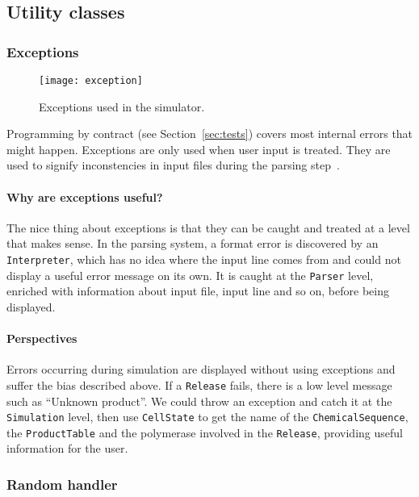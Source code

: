 
\subsection{Utility classes}

\subsubsection{Exceptions}

\begin{figure}[!h]
  \centering
  \texttt{[image: exception]}
  \caption{Exceptions used in the simulator.}
  \label{fig:exception}
\end{figure}

Programming by contract (see Section~\ref{sec:tests}) covers most internal errors that might happen. Exceptions are only used when user input is treated. They are used to signify inconstencies in input files during the parsing step~.

\paragraph{Why are exceptions useful?} The nice thing about exceptions is that they can be caught and treated at a level that makes sense. In the parsing system, a format error is discovered by an \texttt{Interpreter}, which has no idea where the input line comes from and could not display a useful error message on its own. It is caught at the \texttt{Parser} level, enriched with information about input file, input line and so on, before being displayed.

\paragraph{Perspectives} Errors occurring during simulation are displayed without using exceptions and suffer the bias described above. If a \texttt{Release} fails, there is a low level message such as ``Unknown product''. We could throw an exception and catch it at the \texttt{Simulation} level, then use \texttt{CellState} to get the name of the \texttt{ChemicalSequence}, the \texttt{ProductTable} and the polymerase involved in the \texttt{Release}, providing useful information for the user.

\subsubsection{Random handler}

